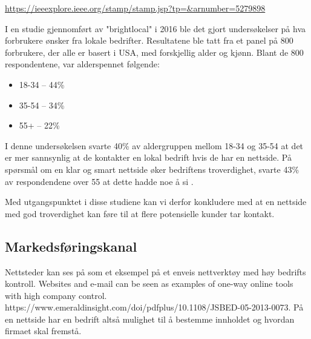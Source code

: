 \url{https://ieeexplore.ieee.org/stamp/stamp.jsp?tp=&arnumber=5279898}

\cite{zhao2009eew}

I en studie gjennomført av  "brightlocal" i 2016 ble det gjort undersøkelser på hva forbrukere ønsker fra lokale bedrifter. Resultatene ble tatt fra et panel på 800 forbrukere, der alle er basert i USA, med forskjellig alder og kjønn. Blant de 800 respondentene, var alderspennet følgende: 

\begin{itemize}
\item 18-34 – 44\%
\item 35-54 – 34\%
\item 55+ – 22\%
\end{itemize}

I denne undersøkelsen svarte 40\% av aldergruppen mellom 18-34 og 35-54 at det er mer sannsynlig at de kontakter en lokal bedrift hvis de har en nettside. På spørsmål om en klar og smart nettside øker bedriftens troverdighet, svarte 43\% av respondendene over 55 at dette hadde noe å si \cite{marchant18wdc}.

Med utgangspunktet i disse studiene kan vi derfor konkludere med at en nettside med god troverdighet kan føre til at flere potensielle kunder tar kontakt.

\subsection{Markedsføringskanal}
Nettsteder kan ses på som et eksempel på et enveis nettverktøy med høy  bedrifts kontroll.
Websites and e-mail can be seen as examples of one-way online tools with high company control. https://www.emeraldinsight.com/doi/pdfplus/10.1108/JSBED-05-2013-0073. På en nettside har en bedrift altså mulighet til å bestemme innholdet og hvordan firmaet skal fremstå. 


